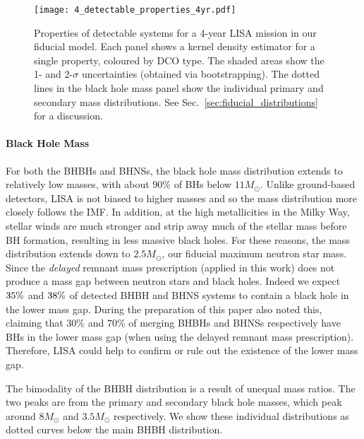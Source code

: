 \begin{figure*}[t]
    \centering
    \texttt{[image: 4\_detectable\_properties\_4yr.pdf]}
    \caption{Properties of detectable systems for a 4-year LISA mission in our fiducial model. Each panel shows a kernel density estimator for a single property, coloured by DCO type. The shaded areas show the 1- and 2-$\sigma$ uncertainties (obtained via bootstrapping). The dotted lines in the black hole mass panel show the individual primary and secondary mass distributions. See Sec.~\ref{sec:fiducial_distributions} for a discussion.}
    \label{fig:fiducial_pdf_distributions}
\end{figure*}

\paragraph{Black Hole Mass}
For both the BHBHs and BHNSs, the black hole mass distribution extends to relatively low masses, with about $90\%$ of BHs below $11 \unit{M_{\odot}}$. Unlike ground-based detectors, LISA is not biased to higher masses and so the mass distribution more closely follows the IMF. In addition, at the high metallicities in the Milky Way, stellar winds are much stronger and strip away much of the stellar mass before BH formation, resulting in less massive black holes. For these reasons, the mass distribution extends down to $2.5 \unit{M_{\odot}}$, our fiducial maximum neutron star mass. Since the \citet{Fryer+2012} \textit{delayed} remnant mass prescription (applied in this work) does not produce a mass gap between neutron stars and black holes. Indeed we expect $35\%{}$ and $38\%{}$ of detected BHBH and BHNS systems to contain a black hole in the lower mass gap. During the preparation of this paper \citet{Shao+2021} also noted this, claiming that $30\%$ and $70\%$ of merging BHBHs and BHNSs respectively have BHs in the lower mass gap (when using the delayed remnant mass prescription). Therefore, LISA could help to confirm or rule out the existence of the lower mass gap.

The bimodality of the BHBH distribution is a result of unequal mass ratios. The two peaks are from the primary and secondary black hole masses, which peak around $8 \unit{M_{\odot}}$ and $3.5 \unit{M_{\odot}}$ respectively. We show these individual distributions as dotted curves below the main BHBH distribution.

